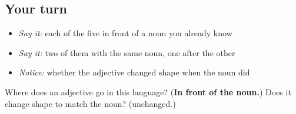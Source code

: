\subsection*{Your turn}
\begin{itemize}
\raggedright
  \item \emph{Say it:} each of the five in front of a noun you already know
  \item \emph{Say it:} two of them with the same noun, one after the other
  \item \emph{Notice:} whether the adjective changed shape when the noun did
\end{itemize}

\begin{tcolorbox}[breakable,colback=teal!4,colframe=teal!35!black,title={Before you move on}]
Where does an adjective go in this language? (\textbf{In front of the noun.}) Does it change shape to match the noun? (unchanged.)
\end{tcolorbox}

